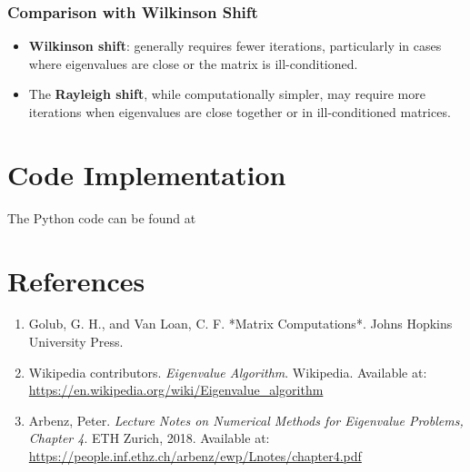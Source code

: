 \documentclass[12pt]{article}
\numberwithin{equation}{subsubsection}
\begin{document}
\subsubsection{Comparison with Wilkinson Shift}
\begin{itemize}
	\item \textbf{Wilkinson shift}: generally requires fewer iterations, particularly in cases where eigenvalues are close or the matrix is ill-conditioned.
	\item The \textbf{Rayleigh shift}, while computationally simpler, may require more iterations when eigenvalues are close together or in ill-conditioned matrices.
\end{itemize}

\section{Code Implementation}
The Python code can be found at

\appendix

\section{References}
\begin{enumerate}
	\item Golub, G. H., and Van Loan, C. F. *Matrix Computations*. Johns Hopkins University Press.
	\item Wikipedia contributors. \textit{Eigenvalue Algorithm}. Wikipedia. Available at: \url{https://en.wikipedia.org/wiki/Eigenvalue_algorithm}
	\item Arbenz, Peter. \textit{Lecture Notes on Numerical Methods for Eigenvalue Problems, Chapter 4}. ETH Zurich, 2018. Available at: \url{https://people.inf.ethz.ch/arbenz/ewp/Lnotes/chapter4.pdf}
	      
\end{enumerate}
\end{document}
